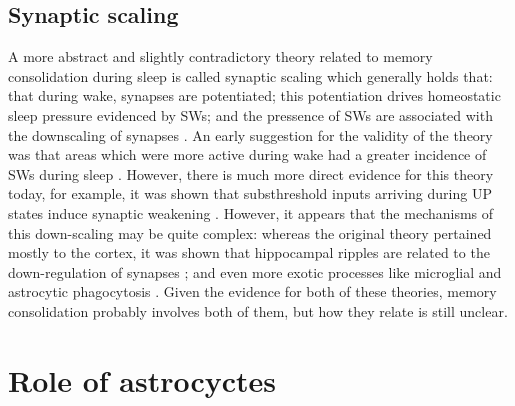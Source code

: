 \subsection*{Synaptic scaling}
A more abstract and slightly contradictory theory related to memory consolidation during sleep is called synaptic scaling which generally holds that: that during wake, synapses are potentiated; this potentiation drives homeostatic sleep pressure evidenced by SWs; and the pressence of SWs are associated with the downscaling of synapses \citep{Tononi2003}. An early suggestion for the validity of the theory was that areas which were more active during wake had a greater incidence of SWs during sleep \citep{Huber2004}. However, there is much more direct evidence for this theory today, for example, it was shown that substhreshold inputs arriving during UP states induce synaptic weakening \citep{Bartram}. However, it appears that the mechanisms of this down-scaling may be quite complex: whereas the original theory pertained mostly to the cortex, it was shown that hippocampal ripples are related to the down-regulation of synapses \citep{Norimoto2018}; and even more exotic processes like microglial and astrocytic phagocytosis \citep{Bellesi,DeVivo2017}. Given the evidence for both of these theories, memory consolidation probably involves both of them, but how they relate is still unclear. 


\section*{Role of astrocyctes}

